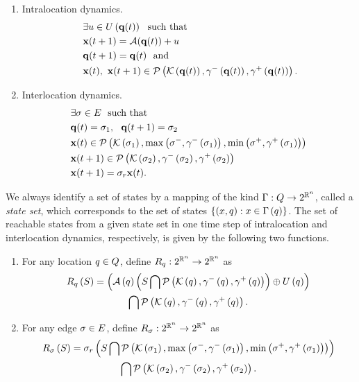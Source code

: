 \begin{enumerate}
\item Intralocation dynamics.
\begin{align}~\label{eqn:intralocation}
\begin{split}
& \exists u\in U\left({\bf q}(t)\right)~~\text{such that}\\
& {\bf x}(t+1) = \mathcal{A}({\bf q}(t))+u\\ 
& {\bf q}(t+1) = {\bf q}(t)~~
\text{and}\\
& {\bf x}(t),~{\bf x}(t+1)\in\mathcal{P}\left(\mathcal{K}\left({\bf q}(t)\right),\gamma^-\left({\bf q}(t)\right),\gamma^+\left({\bf q}(t)\right)\right).
\end{split}
\end{align}
\item Interlocation dynamics.
\begin{align} 
\begin{split}
& \exists \sigma\in E~~\text{such that}\\
& {\bf q}(t)=\sigma_{1},~~{\bf q}(t+1)=\sigma_{2}\\
& {\bf x}(t)\in\mathcal{P}\left(\mathcal{K}\left(\sigma_{1}\right),\max\left(\sigma^-,\gamma^-\left(\sigma_{1}\right)\right),\min\left(\sigma^+,\gamma^+\left(\sigma_{1}\right)\right)\right) \\
& {\bf x}(t+1)\in \mathcal{P}\left(\mathcal{K}\left(\sigma_{2}\right),\gamma^-\left(\sigma_{2}\right),\gamma^+\left(\sigma_{2}\right)\right)\\
& {\bf x}(t+1) = \sigma_r{\bf x}(t).
\end{split}
\end{align}
\end{enumerate}

We always identify a set of states by a mapping of the kind
$\Gamma:Q\rightarrow 2^{\mathbb{R}^n}$, called a \emph{state
set}, which corresponds to the set of states
$\left\{\left(x,q\right):x\in\Gamma\left(q\right)\right\}$.  The set of
reachable states from a given state set in one time step of
intralocation and interlocation dynamics, respectively, is given by
the following two functions.
\begin{enumerate}
\item For any location $q\in Q$, define $R_{q}:2^{\mathbb{R}^n}\rightarrow 2^{\mathbb{R}^n}$ as
\begin{multline*}
R_{q}\left(S\right) = \left(\mathcal{A}\left(q\right)\left(S\bigcap\mathcal{P}\left(\mathcal{K}\left(q\right),\gamma^-\left(q\right),\gamma^+\left(q\right)\right)\right)\oplus U\left(q\right)\right)\\  \bigcap \mathcal{P}\left(\mathcal{K}\left(q\right),\gamma^-\left(q\right),\gamma^+\left(q\right)\right).
\end{multline*}
\item For any edge $\sigma\in E$, define
  $R_{\sigma}:2^{\mathbb{R}^n}\rightarrow 2^{\mathbb{R}^n}$ as
\begin{multline*}
R_{\sigma}\left(S\right) =  \sigma_r\left(S\bigcap \mathcal{P}\left(\mathcal{K}\left(\sigma_{1}\right),\max\left(\sigma^-,\gamma^-\left(\sigma_{1}\right)\right),\min\left(\sigma^+,\gamma^+\left(\sigma_{1}\right) \right)\right)\right) \\ \bigcap\mathcal{P}\left(\mathcal{K}\left(\sigma_{2}\right),\gamma^-\left(\sigma_{2}\right),\gamma^+\left(\sigma_{2}\right)\right).
\end{multline*}
\end{enumerate}

